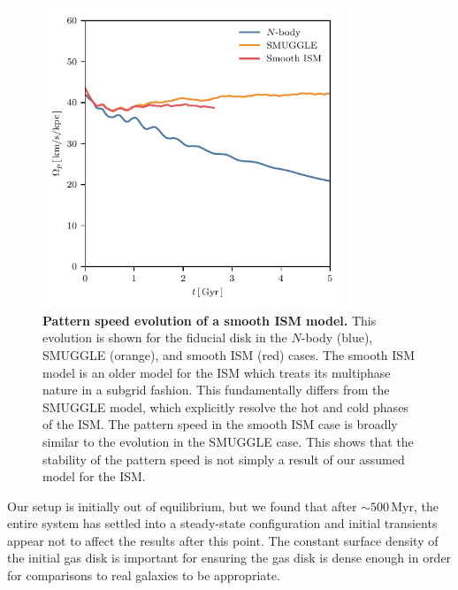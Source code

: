 \documentclass{natureprintstyle}
\newcommand{\Nbody}{$N$-body}
\begin{document}
\begin{figure}[h!]%
\centering
\includegraphics[width=9cm]{fig/fig-GFM.pdf}
\caption{\textbf{Pattern speed evolution of a smooth ISM model.} This
evolution is shown for the fiducial disk in the \Nbody{} (blue), SMUGGLE
(orange), and smooth ISM (red) cases. The smooth ISM model is an older model
for the ISM which treats its multiphase nature in a subgrid
fashion.\cite{2003MNRAS.339..289S} This fundamentally differs from the SMUGGLE
model, which explicitly resolve the hot and cold phases of the
ISM.\cite{2019MNRAS.489.4233M} The pattern speed in the smooth ISM case is
broadly similar to the evolution in the SMUGGLE case. This shows that the
stability of the pattern speed is not simply a result of our assumed model for
the ISM.}
\label{fig:GFM}
\end{figure}

Our setup is initially out of equilibrium, but we found that after
$\sim500\,\textrm{Myr}$, the entire system has settled into a steady-state
configuration and initial transients appear not to affect the results after
this point. The constant surface density of the initial gas disk is important
for ensuring the gas disk is dense enough in order for comparisons to real
galaxies to be appropriate.
\end{document}
